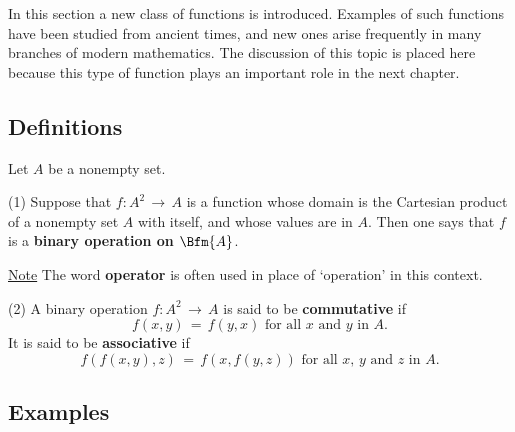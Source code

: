         In this section a new class of functions is introduced. Examples of such functions have been studied from ancient times,
    and new ones arise frequently in many branches of modern mathematics. The discussion of this topic is placed here
    because this type of function plays an important role in the next chapter.


        \subsection{\small{{\bf Definitions}}}
        \label{DefA60.10}

        Let $A$ be a nonempty set.

\V

        (1) Suppose that $f:A^{2} \,{\rightarrow}\, A$ is a function whose domain is the Cartesian product of a nonempty set $A$ with itself,
    and whose values are in $A$. Then one says that $f$ is a
    {\bf binary operation on $\Bfm{A}$}.

        \underline{Note} The word {\bf operator} is often used in place of `operation' in this context.


\V

        (2) A binary operation $f:A^{2} \,{\rightarrow}\, A$ is said to be {\bf commutative} if
        \begin{displaymath}
        f(x,y) \,=\, f(y,x) \mbox{ for all $x$ and $y$ in $A$}.
        \end{displaymath}
    It is said to be {\bf associative} if
        \begin{displaymath}
        f(f(x,y),z) \,=\, f(x,f(y,z)) \mbox{ for all $x$, $y$ and $z$ in $A$}.
        \end{displaymath}

\V
\V


        \subsection{\small{{\bf Examples}}}
        \label{ExampA60.20}

\V

